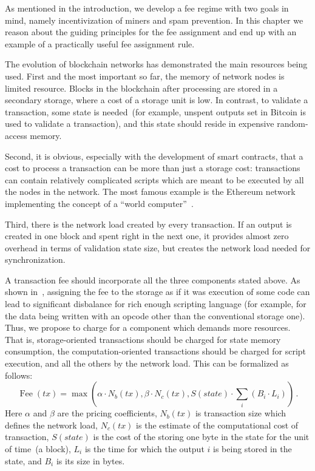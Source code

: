 \documentclass[]{llncs}   %
\begin{document}
As mentioned in the introduction, we develop a fee regime with two goals
in mind, namely incentivization of miners and spam prevention.  In this chapter
we reason about the guiding  principles for the fee assignment and end up with
an example of a practically useful fee assignment rule.

The evolution of blockchain networks has demonstrated the main resources
being used. First and the most important so far, the memory of network nodes 
is limited resource. Blocks in the blockchain after processing are stored in a 
secondary storage, where a cost of a storage unit is low. In contrast, to validate a 
transaction, some state is needed~(for example, unspent outputs set in Bitcoin is used 
to validate a transaction), and this state should reside in expensive random-access memory.   

Second, it is obvious, especially with the development of smart contracts,
that a cost to process a transaction can be more than just a storage cost:
transactions can contain relatively complicated scripts which are meant to be
executed by all the nodes in the network. The most famous example is
the Ethereum network implementing the concept of a ``world computer''~\cite{ethyp}. 

Third, there is the network load created by every transaction. If an output is
created in one block and spent right in the next one, it provides almost zero
overhead in terms of validation state size, but creates the network load needed
for synchronization.

A transaction fee should incorporate all the three components stated above.  As 
shown in~\cite{Earlz2017}, assigning the fee to the storage as if
it was execution of some code can lead to significant disbalance for rich enough
scripting language (for example, for the data being written with an opcode other
than the conventional storage one). Thus, we propose to charge for a component
which demands more resources. That is, storage-oriented transactions should be
charged for state memory consumption, the computation-oriented transactions
should be charged for script execution, and all the others by the network load.
This can be formalized as follows:
\begin{equation}
    \operatorname{Fee}(tx) = \max\left(\alpha \cdot N_b(tx), \beta \cdot N_c(tx),
    S(state) \cdot \sum_i (B_i \cdot L_i) \right)\,.
    \label{eq:max}
\end{equation}
Here $\alpha$ and $\beta$ are the pricing coefficients, $N_b(tx)$ is transaction size 
which defines the network load, $N_c(tx)$ is the estimate of the computational 
cost of transaction, $S(state)$ is the cost of the storing one byte in the 
state for the unit of time~(a block), $L_i$ is the time for which the output $i$ is being stored 
in the state, and $B_i$ is its size in bytes.
\end{document}
